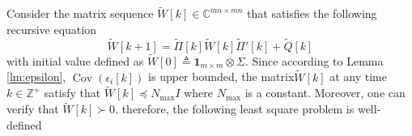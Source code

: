\documentclass[12pt]{article}
\newcommand{\Cb}{{\mathbb{C}}}
\newcommand{\Zb}{{\mathbb{Z}}}
\DeclareMathOperator{\cov}{Cov}
\newtheorem{lemma}{\textbf{Lemma}}
\newtheorem*{proof}{\textbf{Proof}}
\begin{document}
Consider the matrix sequence $\tilde{W}[k]\in\Cb^{mn\times mn}$ that satisfies the following recursive equation 
\begin{equation}\label{eq:defW}
\tilde{W}[k+1]=\tilde{\Pi}[k] \tilde{W}[k] \tilde{\Pi}{'}[k] +\tilde{Q}[k]
\end{equation}
with initial value defined as $\tilde{W}[0]\triangleq \mathbf{1}_{m\times m}  \otimes \Sigma .$
Since according to Lemma \ref{lm:epsilon}, $\cov\left(\epsilon_i[k]\right)$ is upper bounded, the matrix$\tilde{W}[k]$ at any time $k\in\Zb^+$ satisfy that $\tilde{W}[k] \preceq N_{\max} I$ where $N_{\max}$ is a constant. Moreover, one can verify that $\tilde{W}[k]\succ 0$. therefore, the following least square problem is well-defined
%
%
%
\end{document}
